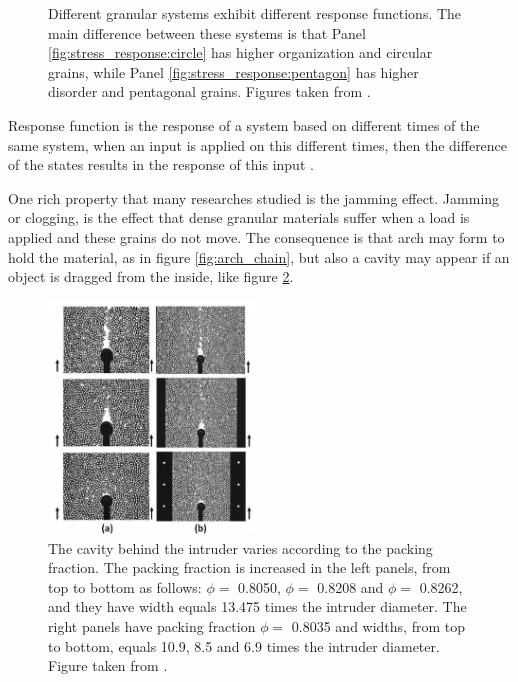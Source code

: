 \begin{figure}
\begin{minipage}{.45\linewidth}
        \label{fig:stress_response:pentagon}
    \end{minipage}
    \caption[Stress response in ordered/disordered granular packings.]{Different granular systems exhibit different response functions. The main difference between these systems is that Panel \ref{fig:stress_response:circle} has higher organization and circular grains, while Panel \ref{fig:stress_response:pentagon} has higher disorder and pentagonal grains. Figures taken from \cite{Sensitivity_of_Stress_Response_Function_to_Packing_Preparation}.}
    \label{fig:stress_response}
\end{figure}

    Response function is the response of a system based on different times of the same system, when an input is applied on this different times, then the difference of the states results in the response of this input \cite{The_Physics_of_Granular_Media}.

    One rich property that many researches studied \cite{Caio-Tese, Felipe-Tese, Eduardo-Tese, Non-Gaussian_behavior_in_jamming_unjamming_transition_in_dense_granular_materials, Da_Cruz-Tese} is the jamming effect. Jamming or clogging, is the effect that dense granular materials suffer when a load is applied and these grains do not move. The consequence is that arch may form to hold the material, as in figure \ref{fig:arch_chain}, but also a cavity may appear if an object is dragged from the inside, like figure \ref{fig:box_Kolb}.

\begin{figure}
    \centering
    \includegraphics[width=0.5\textwidth]{04-figuras/box_Kolb.png}
    \caption[Cavity formed by a fixed intruder in a dense granular packing.]{The cavity behind the intruder varies according to the packing fraction. The packing fraction is increased in the left panels, from top to bottom as follows: $\phi=$ 0.8050, $\phi=$ 0.8208 and $\phi=$ 0.8262, and they have width equals 13.475 times the intruder diameter. The right panels have packing fraction $\phi=$ 0.8035 and widths, from top to bottom, equals 10.9, 8.5 and 6.9 times the intruder diameter. Figure taken from \cite{Jamming_and_unjamming_by_penetration_of_a_cylindrical_intruder}.}
    \label{fig:box_Kolb}
\end{figure}

